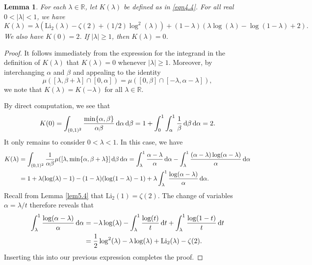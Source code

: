 \documentclass[12pt,reqno]{amsart}
\newtheorem{lemma}[theorem]{Lemma}
\theoremstyle{definition}
\theoremstyle{remark}
\numberwithin{equation}{section}
\def \R {\mathbb{R}}
\def\d{{\,{\rm d}}}
\def \Li {\mathrm{Li}}
\newcommand\1{\mathds{1}}
\begin{document}
\begin{lemma}\label{lem5.6}
    For each $\lambda\in\R$, let $K(\lambda)$ be defined as in \eqref{eqn4.4}. For all real $0<|\lambda|< 1$, we have
    \begin{equation*}
        K(\lambda)= \lambda(\Li_2(\lambda) - \zeta(2) + (1/2)\log^2(\lambda)) + (1-\lambda)(\lambda\log(\lambda) - \log(1-\lambda)+2).
    \end{equation*}
    We also have $K(0)=2$. If $|\lambda|\geqslant 1$, then $K(\lambda)=0$.
\end{lemma}
\begin{proof}
    It follows immediately from the expression for the integrand in the definition of $K(\lambda)$ that $K(\lambda) = 0$ whenever $|\lambda|\geqslant 1$. Moreover, by interchanging $\alpha$ and $\beta$ and appealing to the identity
    \begin{equation*}
        \mu([\lambda,\beta+\lambda]\cap [0,\alpha]) = \mu([0,\beta]\cap [-\lambda,\alpha-\lambda]),
    \end{equation*}
    we note that $K(\lambda) = K(-\lambda)$ for all $\lambda\in\R$.

    By direct computation, we see that
    \begin{equation*}
        K(0) = \int_{(0,1)^2}\frac{\min\{\alpha,\beta\}}{\alpha\beta}\d\alpha\d\beta =  1 +\int_0^1\int_\alpha^1\frac{1}{\beta}\d\beta\d\alpha = 2.
    \end{equation*}
    It only remains to consider $0<\lambda<1$. In this case, we have
    \begin{align*}
        K(\lambda) &= \int_{(0,1)^2}\frac{1}{\alpha\beta}\mu([\lambda,\min\{\alpha,\beta+\lambda\}]\d\beta\d\alpha = \int_\lambda^1 \frac{\alpha-\lambda}{\alpha}\d\alpha - \int_\lambda^1\frac{(\alpha-\lambda)\log(\alpha-\lambda)}{\alpha}\d\alpha\\
        &= 1+\lambda(\log(\lambda) - 1) - (1-\lambda)(\log(1-\lambda) - 1) + \lambda\int_\lambda^1\frac{\log(\alpha - \lambda)}{\alpha}\d\alpha.
    \end{align*}
    Recall from Lemma \ref{lem5.4} that $\Li_2(1) = \zeta(2)$. The change of variables $\alpha = \lambda/t$ therefore reveals that
    \begin{align*}
        \int_\lambda^1\frac{\log(\alpha - \lambda)}{\alpha}\d\alpha &= -\lambda\log(\lambda) - \int_\lambda^1\frac{\log(t)}{t}\d t+ \int_\lambda^1\frac{\log(1-t)}{t}\d t\\
        &=\frac{1}{2}\log^2(\lambda) - \lambda\log(\lambda) + \Li_2(\lambda) -\zeta(2).
    \end{align*}
Inserting this into our previous expression completes the proof.
\end{proof}
\end{document}
